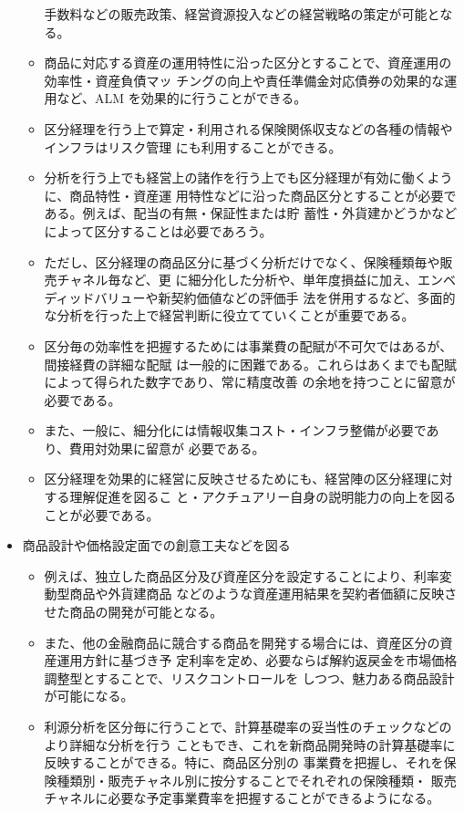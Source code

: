 \documentclass[report,gutter=10mm,fore-edge=10mm,uplatex,dvipdfmx]{jlreq}
\begin{document}
\begin{itemize}
\begin{itemize}
 手数料などの販売政策、経営資源投入などの経営戦略の策定が可能となる。
\item[] 商品に対応する資産の運用特性に沿った区分とすることで、資産運用の効率性・資産負債マッ
 チングの向上や責任準備金対応債券の効果的な運用など、ALM を効果的に行うことができる。
\item[] 区分経理を行う上で算定・利用される保険関係収支などの各種の情報やインフラはリスク管理
 にも利用することができる。
\item[] 分析を行う上でも経営上の諸作を行う上でも区分経理が有効に働くように、商品特性・資産運
 用特性などに沿った商品区分とすることが必要である。例えば、配当の有無・保証性または貯
 蓄性・外貨建かどうかなどによって区分することは必要であろう。
\item[] ただし、区分経理の商品区分に基づく分析だけでなく、保険種類毎や販売チャネル毎など、更
 に細分化した分析や、単年度損益に加え、エンベディッドバリューや新契約価値などの評価手
 法を併用するなど、多面的な分析を行った上で経営判断に役立てていくことが重要である。
\item[] 区分毎の効率性を把握するためには事業費の配賦が不可欠ではあるが、間接経費の詳細な配賦
 は一般的に困難である。これらはあくまでも配賦によって得られた数字であり、常に精度改善
 の余地を持つことに留意が必要である。
\item[] また、一般に、細分化には情報収集コスト・インフラ整備が必要であり、費用対効果に留意が
 必要である。
\item[] 区分経理を効果的に経営に反映させるためにも、経営陣の区分経理に対する理解促進を図るこ
 と・アクチュアリー自身の説明能力の向上を図ることが必要である。
\end{itemize}
 \item[] 商品設計や価格設定面での創意工夫などを図る
\begin{itemize}
\item[] 例えば、独立した商品区分及び資産区分を設定することにより、利率変動型商品や外貨建商品
 などのような資産運用結果を契約者価額に反映させた商品の開発が可能となる。
\item[] また、他の金融商品に競合する商品を開発する場合には、資産区分の資産運用方針に基づき予
 定利率を定め、必要ならば解約返戻金を市場価格調整型とすることで、リスクコントロールを
 しつつ、魅力ある商品設計が可能になる。
\item[] 利源分析を区分毎に行うことで、計算基礎率の妥当性のチェックなどのより詳細な分析を行う
 こともでき、これを新商品開発時の計算基礎率に反映することができる。特に、商品区分別の
 事業費を把握し、それを保険種類別・販売チャネル別に按分することでそれぞれの保険種類・
 販売チャネルに必要な予定事業費率を把握することができるようになる。
\end{itemize}
\end{itemize}
\end{document}
